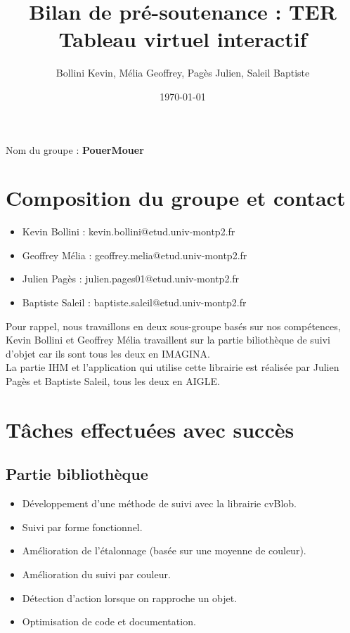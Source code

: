 \documentclass{article}
\title{Bilan de pré-soutenance : TER Tableau virtuel interactif}
\author{Bollini Kevin, Mélia Geoffrey, Pagès Julien, Saleil Baptiste}
\date{\today}
\begin{document}
	\maketitle
	Nom du groupe : \textbf{PouerMouer}
	
	\section{Composition du groupe et contact}
	
	\begin{itemize}
	\item Kevin Bollini : kevin.bollini@etud.univ-montp2.fr \\
	\item Geoffrey Mélia : geoffrey.melia@etud.univ-montp2.fr \\
	\item Julien Pagès : julien.pages01@etud.univ-montp2.fr \\
	\item Baptiste Saleil : baptiste.saleil@etud.univ-montp2.fr \\
	\end{itemize}
	
	Pour rappel, nous travaillons en deux sous-groupe basés sur nos compétences, Kevin Bollini et Geoffrey Mélia travaillent
	sur la partie biliothèque de suivi d'objet car ils sont tous les deux en IMAGINA. \\
	La partie IHM et l'application qui utilise cette librairie est réalisée par Julien Pagès et Baptiste Saleil, tous les deux en AIGLE. \\
	\section{Tâches effectuées avec succès}
		\subsection{Partie bibliothèque}
		\begin{itemize}
		\item Développement d'une méthode de suivi avec la librairie cvBlob.
		\item Suivi par forme fonctionnel.
		\item Amélioration de l'étalonnage (basée sur une moyenne de couleur).
		\item Amélioration du suivi par couleur.
		\item Détection d'action lorsque on rapproche un objet.
		\item Optimisation de code et documentation.
		\end{itemize}
		
\end{document}
